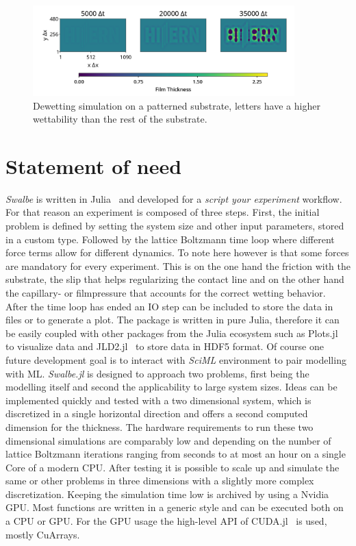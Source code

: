 \begin{figure}
    \centering
    \includegraphics[width = 0.9\textwidth]{graphics/Hiern_logo.png}
    \caption{Dewetting simulation on a patterned substrate, letters have a higher wettability than the rest of the substrate.}
    \label{fig:logo}
\end{figure}

\section{Statement of need}

\textit{Swalbe} is written in Julia~\cite{doi:10.1137/141000671} and developed for a \textit{script your experiment} workflow.
For that reason an experiment is composed of three steps.
First, the initial problem is defined by setting the system size and other input parameters, stored in a custom type.
Followed by the lattice Boltzmann time loop where different force terms allow for different dynamics.
To note here however is that some forces are mandatory for every experiment.
This is on the one hand the friction with the substrate, the slip that helps regularizing the contact line and on the other hand the capillary- or filmpressure that accounts for the correct wetting behavior.  
After the time loop has ended an IO step can be included to store the data in files or to generate a plot.
The package is written in pure Julia, therefore it can be easily coupled with other packages from the Julia ecosystem such as Plots.jl~\cite{tom_breloff_2021} to visualize data and JLD2.jl~\cite{JLD2.jl} to store data in HDF5 format.
Of course one future development goal is to interact with \textit{SciML} environment to pair modelling with ML.  
\textit{Swalbe.jl} is designed to approach two problems, first being the modelling itself and second the applicability to large system sizes.
Ideas can be implemented quickly and tested with a two dimensional system, which is discretized in a single horizontal direction and offers a second computed dimension for the thickness.
The hardware requirements to run these two dimensional simulations are comparably low and depending on the number of lattice Boltzmann iterations ranging from seconds to at most an hour on a single Core of a modern CPU.
After testing it is possible to scale up and simulate the same or other problems in three dimensions with a slightly more complex discretization.
Keeping the simulation time low is archived by using a Nvidia GPU.
Most functions are written in a generic style and can be executed both on a CPU or GPU.
For the GPU usage the high-level API of CUDA.jl~\cite{besard2018juliagpu, besard2019prototyping} is used, mostly CuArrays.

